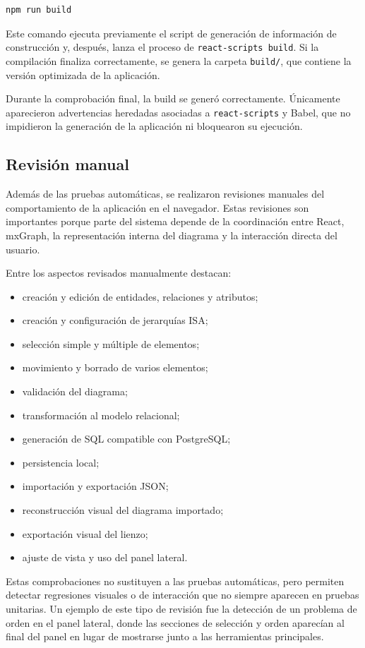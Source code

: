 \begin{verbatim}
npm run build
\end{verbatim}

Este comando ejecuta previamente el script de generación de información de construcción y, después, lanza el proceso de \texttt{react-scripts build}. Si la compilación finaliza correctamente, se genera la carpeta \texttt{build/}, que contiene la versión optimizada de la aplicación.

Durante la comprobación final, la build se generó correctamente. Únicamente aparecieron advertencias heredadas asociadas a \texttt{react-scripts} y Babel, que no impidieron la generación de la aplicación ni bloquearon su ejecución.

\subsection{Revisión manual}

Además de las pruebas automáticas, se realizaron revisiones manuales del comportamiento de la aplicación en el navegador. Estas revisiones son importantes porque parte del sistema depende de la coordinación entre React, mxGraph, la representación interna del diagrama y la interacción directa del usuario.

Entre los aspectos revisados manualmente destacan:

\begin{itemize}
\item creación y edición de entidades, relaciones y atributos;
\item creación y configuración de jerarquías ISA;
\item selección simple y múltiple de elementos;
\item movimiento y borrado de varios elementos;
\item validación del diagrama;
\item transformación al modelo relacional;
\item generación de SQL compatible con PostgreSQL;
\item persistencia local;
\item importación y exportación JSON;
\item reconstrucción visual del diagrama importado;
\item exportación visual del lienzo;
\item ajuste de vista y uso del panel lateral.
\end{itemize}

Estas comprobaciones no sustituyen a las pruebas automáticas, pero permiten detectar regresiones visuales o de interacción que no siempre aparecen en pruebas unitarias. Un ejemplo de este tipo de revisión fue la detección de un problema de orden en el panel lateral, donde las secciones de selección y orden aparecían al final del panel en lugar de mostrarse junto a las herramientas principales.

